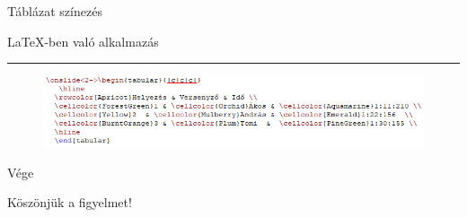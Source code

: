 \documentclass[aspectratio=1610,dvipsnames,xcolor=table]{beamer}
\begin{document}
\begin{frame}[fragile]{Táblázat színezés}
\begin{center}
\LaTeX-ben való alkalmazás
\noindent
{\color{Dandelion} \rule{\linewidth}{1mm}}
\end{center}
	\begin{figure}[H]
		\includegraphics[scale=0.8]{img/tablealkalmazas.png}
			 
	\end{figure}
\end{frame}

\begin{frame}[fragile]{Vége}
\begin{center}
\Huge Köszönjük a figyelmet!
\end{center}
\end{frame}
\end{document}
